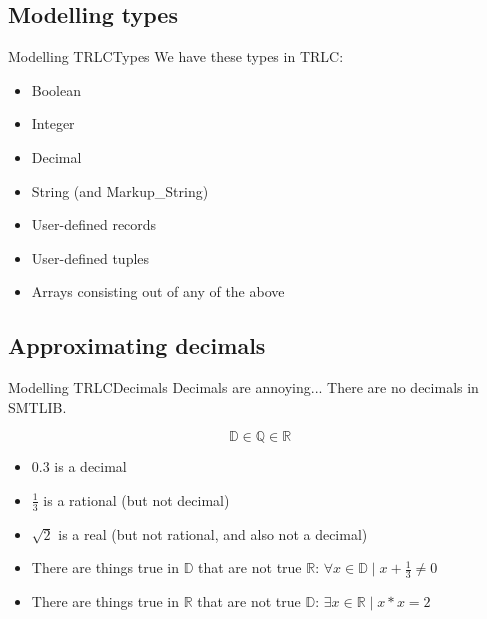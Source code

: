 \documentclass[aspectratio=169]{beamer}
\begin{document}
\subsection{Modelling types}
\begin{frame}{Modelling TRLC}{Types}
  We have these types in TRLC:
  \begin{itemize}
  \item Boolean 
  \item Integer 
  \item Decimal 
  \item String (and Markup\_String) 
  \item User-defined records \only<5->{(SMTLIB Datatypes)}
  \item User-defined tuples 
  \item Arrays consisting out of any of the above 
  \end{itemize}
\end{frame}

\subsection{Approximating decimals}

\begin{frame}{Modelling TRLC}{Decimals}
  Decimals are annoying... There are no decimals in SMTLIB.
  \begin{center}
    \begin{equation*}
      \mathbb{D} \in \mathbb{Q} \in \mathbb{R}
    \end{equation*}
  \end{center}
  \pause
  \begin{itemize}
  \item $0.3$ is a decimal
    \pause
  \item $\frac{1}{3}$ is a rational (but not decimal)
    \pause
  \item $\sqrt{2}$ is a real (but not rational, and also not a decimal)
    \pause
  \item There are things true in $\mathbb{D}$ that are not true
    $\mathbb{R}$: $\forall x \in \mathbb{D} \mid x + \frac{1}{3} \neq 0$
    \pause
  \item There are things true in $\mathbb{R}$ that are not true
    $\mathbb{D}$: $\exists x \in \mathbb{R} \mid x * x = 2$
  \end{itemize}
\end{frame}
\end{document}
